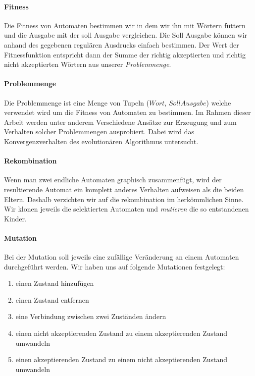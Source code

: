 \paragraph{Fitness}
Die Fitness von Automaten bestimmen wir in dem wir ihn mit Wörtern füttern und die Ausgabe mit der soll Ausgabe vergleichen. Die Soll Ausgabe können wir anhand des gegebenen regulären Ausdrucks einfach bestimmen. Der Wert der Fitnessfunktion entspricht dann der Summe der richtig akzeptierten und richtig nicht akzeptierten Wörtern aus unserer \textit{Problemmenge}.\\

\paragraph{Problemmenge}
Die Problemmenge ist eine Menge von Tupeln ($Wort$, $Soll Ausgabe$) welche verwendet wird um die Fitness von Automaten zu bestimmen. Im Rahmen dieser Arbeit werden unter anderem Verschiedene Ansätze zur Erzeugung und zum Verhalten solcher Problemmengen ausprobiert. Dabei wird das Konvergenzverhalten des evolutionären Algorithmus untersucht.\\

\paragraph{Rekombination}
Wenn man zwei endliche Automaten graphisch zusammenfügt, wird der resultierende Automat ein komplett anderes Verhalten aufweisen als die beiden Eltern. Deshalb verzichten wir auf die rekombination im herkömmlichen Sinne. Wir klonen jeweils die selektierten Automaten und \textit{mutieren} die so entstandenen Kinder.\\

\paragraph{Mutation}
Bei der Mutation soll jeweils eine zufällige Veränderung an einem Automaten durchgeführt werden. Wir haben uns auf folgende Mutationen festgelegt:\\
\begin{enumerate}
	\item einen Zustand hinzufügen
	\item einen Zustand entfernen
	\item eine Verbindung zwischen zwei Zuständen ändern
	\item einen nicht akzeptierenden Zustand zu einem akzeptierenden Zustand umwandeln
	\item einen akzeptierenden Zustand zu einem nicht akzeptierenden Zustand umwandeln
\end{enumerate}